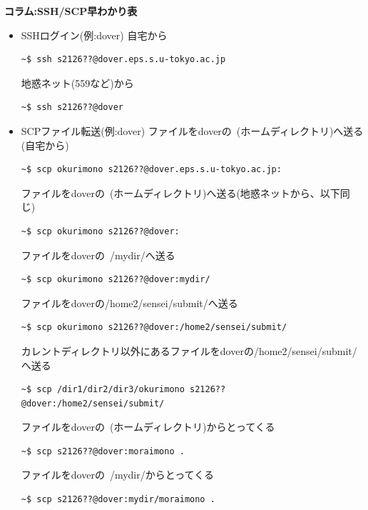\documentclass[a4j]{ltjsreport}
\begin{document}
    \begin{itembox}[l]{\textbf{コラム:SSH/SCP早わかり表}}
        \begin{itemize}
            \item SSHログイン(例:dover)
            自宅から
            \begin{lstlisting}[numbers=none]
    ~$ ssh s2126??@dover.eps.s.u-tokyo.ac.jp
            \end{lstlisting}
            地惑ネット(559など)から
            \begin{lstlisting}[numbers=none]
    ~$ ssh s2126??@dover
            \end{lstlisting}
            \item SCPファイル転送(例:dover)
            ファイルをdoverの~(ホームディレクトリ)へ送る(自宅から)
            \begin{lstlisting}[numbers=none]
    ~$ scp okurimono s2126??@dover.eps.s.u-tokyo.ac.jp:
            \end{lstlisting}
            ファイルをdoverの~(ホームディレクトリ)へ送る(地惑ネットから、以下同じ)
            \begin{lstlisting}[numbers=none]
    ~$ scp okurimono s2126??@dover:
            \end{lstlisting}
            ファイルをdoverの~/mydir/へ送る
            \begin{lstlisting}[numbers=none]
    ~$ scp okurimono s2126??@dover:mydir/
            \end{lstlisting}
            ファイルをdoverの/home2/sensei/submit/へ送る
            \begin{lstlisting}[numbers=none]
    ~$ scp okurimono s2126??@dover:/home2/sensei/submit/
            \end{lstlisting}
            カレントディレクトリ以外にあるファイルをdoverの/home2/sensei/submit/へ送る
            \begin{lstlisting}[numbers=none]
    ~$ scp /dir1/dir2/dir3/okurimono s2126??@dover:/home2/sensei/submit/
            \end{lstlisting}
            ファイルをdoverの~(ホームディレクトリ)からとってくる
            \begin{lstlisting}[numbers=none]
    ~$ scp s2126??@dover:moraimono .
            \end{lstlisting}
            ファイルをdoverの~/mydir/からとってくる
            \begin{lstlisting}[numbers=none]
    ~$ scp s2126??@dover:mydir/moraimono .
            \end{lstlisting}

\end{itemize}
\end{itembox}
\end{document}

